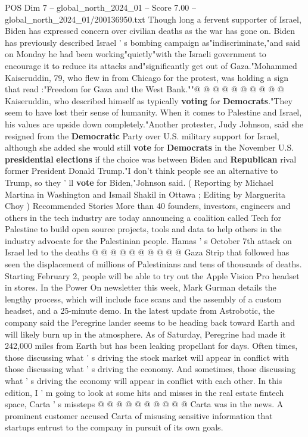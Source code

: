 \begin{textsample}{POS Dim 7 – global\_north\_2024\_01 – Score 7.00 – global\_north\_2024\_01/200136950.txt}
Though long a fervent supporter of Israel, Biden has expressed concern over civilian deaths as the war has gone on.
Biden has previously described Israel ' s bombing campaign as"indiscriminate,"and said on Monday he had been working"quietly"with the Israeli government to encourage it to reduce its attacks and"significantly get out of Gaza."Mohammed Kaiseruddin, 79, who flew in from Chicago for the protest, was holding a sign that read :"Freedom for Gaza and the West Bank.""@ @ @ @ @ @ @ @ @ @ Kaiseruddin, who described himself as typically \textbf{voting} for \textbf{Democrats}."They seem to have lost their sense of humanity.
When it comes to Palestine and Israel, his values are upside down completely."Another protester, Judy Johnson, said she resigned from the \textbf{Democratic} Party over U.S. military support for Israel, although she added she would still \textbf{vote} for \textbf{Democrats} in the November U.S. \textbf{presidential} \textbf{elections} if the choice was between Biden and \textbf{Republican} rival former President Donald Trump."I don't think people see an alternative to Trump, so they ' ll \textbf{vote} for Biden,"Johnson said. ( Reporting by Michael Martina in Washington and Ismail Shakil in Ottawa ; Editing by Marguerita Choy ) Recommended Stories More than 40 founders, investors, engineers and others in the tech industry are today announcing a coalition called Tech for Palestine to build open source projects, tools and data to help others in the industry advocate for the Palestinian people.
Hamas ' s October 7th attack on Israel led to the deaths @ @ @ @ @ @ @ @ @ @ Gaza Strip that followed has seen the displacement of millions of Palestinians and tens of thousands of deaths.
Starting February 2, people will be able to try out the Apple Vision Pro headset in stores.
In the Power On newsletter this week, Mark Gurman details the lengthy process, which will include face scans and the assembly of a custom headset, and a 25-minute demo.
In the latest update from Astrobotic, the company said the Peregrine lander seems to be heading back toward Earth and will likely burn up in the atmosphere.
As of Saturday, Peregrine had made it 242,000 miles from Earth but has been leaking propellant for days.
Often times, those discussing what ' s driving the stock market will appear in conflict with those discussing what ' s driving the economy.
And sometimes, those discussing what ' s driving the economy will appear in conflict with each other.
In this edition, I ' m going to look at some hits and misses in the real estate fintech space, Carta ' s missteps @ @ @ @ @ @ @ @ @ @ Carta was in the news.
A prominent customer accused Carta of misusing sensitive information that startups entrust to the company in pursuit of its own goals.

\end{textsample}
